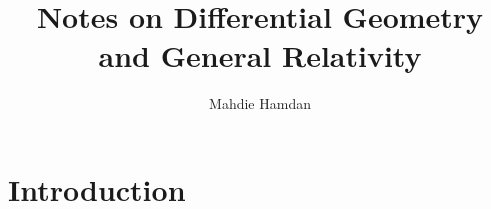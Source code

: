 \documentclass[11pt, tikz]{book}
\begin{document}
\newcommand{\bicatlca}{\operatorname{BicatLCA}}
\newcommand{\born}[1]{\mathcal{#1}}
\newcommand{\topalg}{\operatorname{TopAlg}}
\newcommand{\fm}[1]{\cat{M}_{#1}^{\operatorname{( F)}} }
\newcommand{\res}{\operatorname{Restr}}
\title{Notes on Differential Geometry and General Relativity}
\author{Mahdie Hamdan}
\maketitle
\newpage 
\tableofcontents 
\newpage

\chapter{Introduction}
\end{document}
